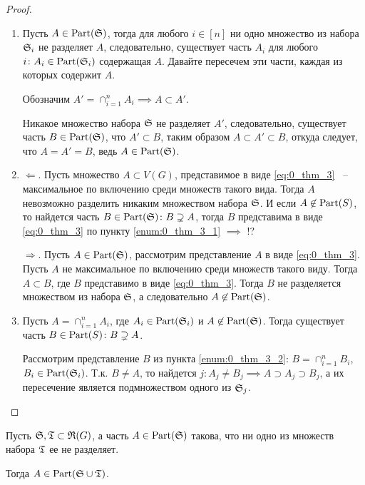 \begin{proof}
	\begin{enumerate}
		\item Пусть $A \in \Part(\S)$, тогда для любого  $i \in [n]$ ни одно множество из набора  $\S_i$ не разделяет  $A$, следовательно, существует часть $A_i$ для любого $i \colon A_i \in \Part(\S_i)$ содержащая  $A$. Давайте пересечем эти части, каждая из которых содержит $A$.
			
			Обозначим  $A' = \cap_{i = 1}^{n} A_i \implies A \subset A'$.

			Никакое множество набора $\S$ не разделяет  $A'$, следовательно, существует часть  $B \in \Part(\S)$, что  $A' \subset B$, таким образом  $A \subset A' \subset B$, откуда следует, что  $A = A' = B$, ведь $A \in \Part(\S)$. 
		\item $\Longleftarrow$. Пусть множество $A \subset V(G)$, представимое в виде \eqref{eq:0_thm_3} ~-- максимальное по включению среди множеств такого вида. Тогда  $A$ невозможно разделить никаким множеством набора  $\S$. И если  $A \not \in \Part(S)$, то найдется часть  $B \in \Part(\S) \colon B \supsetneq A$, тогда  $B$ представима в виде \eqref{eq:0_thm_3} по пункту \eqref{enum:0_thm_3_1}  $\implies $ !?

			$\Longrightarrow$. Пусть  $A \in \Part(\S)$, рассмотрим представление  $A$ в виде  \eqref{eq:0_thm_3}. Пусть $A$ не максимальное по включению среди множеств такого виду. Тогда  $A \subset B$, где  $B$ представимо в виде \eqref{eq:0_thm_3}. Тогда  $B$ не разделяется множеством из набора  $\S$, а следовательно  $A \not \in \Part(\S)$.

		\item Пусть  $A = \cap_{i = 1}^{n} A_i$, где $A_i \in \Part(\S_i)$ и  $A \not \in \Part(\S)$.
			Тогда существует часть  $B \in \Part(S) \colon B \supsetneq A$.

			Рассмотрим представление  $B$ из пункта \eqref{enum:0_thm_3_2}:  $B = \cap_{i = 1}^{n} B_i$, $B_i \in \Part(\S_i)$. Т.к.  $B \neq A$, то найдется $j \colon A_j \neq B_j \implies A \supset A_j \supset B_j$, а их пересечение является подмножеством одного из  $\S_j$.
	\end{enumerate}
	
\end{proof}

\begin{customlm}{0.1}
	Пусть $\S, \T \subset \R(G)$, а часть  $A \in \Part(\S)$ такова, что ни одно из множеств набора  $\T$ ее не разделяет.

	Тогда  $A \in \Part(\S \cup \T)$.
\end{customlm}

